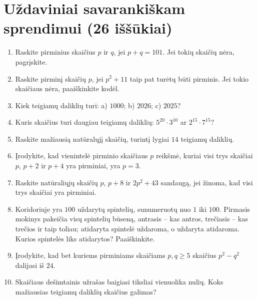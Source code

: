 \documentclass[11pt,a4paper]{scrartcl}
\begin{document}
\vspace{1cm}

\newpage
\section{Uždaviniai savarankiškam sprendimui (26 iššūkiai)}

\begin{enumerate}
    \renewcommand{\labelenumi}{\textbf{\theenumi.}}
    \item Raskite pirminius skaičius \(p\) ir \(q\), jei \(p+q=101\). Jei tokių skaičių nėra, pagrįskite.
    \item Raskite pirminį skaičių \(p\), jei \(p^2+11\) taip pat turėtų būti pirminis. Jei tokio skaičiaus nėra, paaiškinkite kodėl.
    \item Kiek teigiamų daliklių turi: a) $1000$; b) $2026$; c) $2025$?
    \item Kuris skaičius turi daugiau teigiamų daliklių: \(5^{20}\cdot3^{10}\) ar \(2^{15}\cdot7^{15}\)?
    \item Raskite mažiausią natūralųjį skaičių, turintį lygiai $14$ teigiamų daliklių.
    \item Įrodykite, kad vienintelė pirminio skaičiaus \(p\) reikšmė, kuriai visi trys skaičiai \(p\), \(p+2\) ir \(p+4\) yra pirminiai, yra \(p=3\).
    \item Raskite natūraliųjų skaičių \(p\), \(p+8\) ir \(2p^2+43\) sandaugą, jei žinoma, kad visi trys skaičiai yra pirminiai.
    \item Koridoriuje yra $100$ uždarytų spintelių, sunumeruotų nuo $1$ iki $100$. Pirmasis mokinys pakeičia visų spintelių būseną, antrasis – kas antros, trečiasis – kas trečios ir taip toliau; atidaryta spintelė uždaroma, o uždaryta atidaroma. Kurios spintelės liks atidarytos? Paaiškinkite.
    \item Įrodykite, kad bet kuriems pirminiams skaičiams \(p,q\ge5\) skaičius \(p^2-q^2\) dalijasi iš $24$.
    \item Skaičiaus dešimtainis užrašas baigiasi tiksliai vienuolika nulių. Koks mažiausias teigiamų daliklių skaičius galimas?
\end{enumerate}
\end{document}
